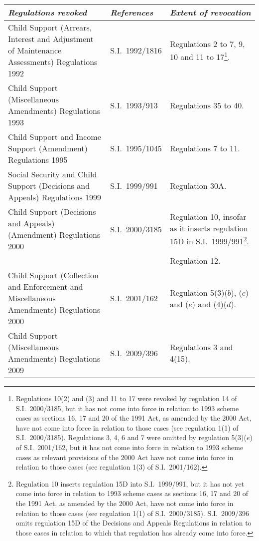 \documentclass[12pt,a4paper]{article}
\begin{document}
\begin{longtable}{p{149.63034pt}p{72.78448pt}p{104.93481pt}}
\hline
\itshape Regulations revoked	& \itshape References	& \itshape Extent of revocation\\
\hline
\endhead
\hline
\endlastfoot
Child Support (Arrears, Interest and Adjustment of Maintenance Assessments) Regulations 1992	&S.I.~1992/1816	&Regulations 2 to 7, 9, 10 and 11 to 17\footnote{Regulations 10(2) and (3) and 11 to 17 were revoked by regulation 14 of S.I.~2000/3185, but it has not come into force in relation to 1993 scheme cases as sections 16, 17 and 20 of the 1991 Act, as amended by the 2000 Act, have not come into force in relation to those cases (see regulation 1(1) of S.I.~2000/3185). Regulations 3, 4, 6 and 7 were omitted by regulation 5(3)($e$)  of S.I.~2001/162, but it has not come into force in relation to 1993 scheme cases as relevant provisions of the 2000 Act have not come into force in relation to those cases (see regulation 1(3) of S.I.~2001/162).}.\\
Child Support (Miscellaneous Amendments) Regulations 1993	&S.I.~1993/913	&Regulations 35 to 40.\\
Child Support and Income Support (Amendment) Regulations 1995	&S.I.~1995/1045	&Regulations 7 to 11.\\
Social Security and Child Support (Decisions and Appeals) Regulations 1999	&S.I.~1999/991	&Regulation 30A.\\
Child Support (Decisions and Appeals) (Amendment) Regulations 2000	&S.I.~2000/3185	
&
Regulation 10, insofar as it inserts regulation 15D in S.I.~1999/991\footnote{Regulation 10 inserts regulation 15D into S.I.~1999/991, but it has not yet come into force in relation to 1993 scheme cases as sections 16, 17 and 20 of the 1991 Act, as amended by the 2000 Act, have not come into force in relation to those cases (see regulation 1(1) of S.I.~2000/3185). S.I.~2009/396 omits regulation 15D of the Decisions and Appeals Regulations in relation to those cases in relation to which that regulation has already come into force.}.
\\
&&Regulation 12.\\
Child Support (Collection and Enforcement and Miscellaneous Amendments) Regulations 2000	&S.I.~2001/162	&Regulation 5(3)($b$), ($c$)  and ($e$)  and (4)($d$).\\
Child Support (Miscellaneous Amendments) Regulations 2009	&S.I.~2009/396	&\hbadness=10000 Regulations 3 and 4(15).\\
\end{longtable}
\end{document}
